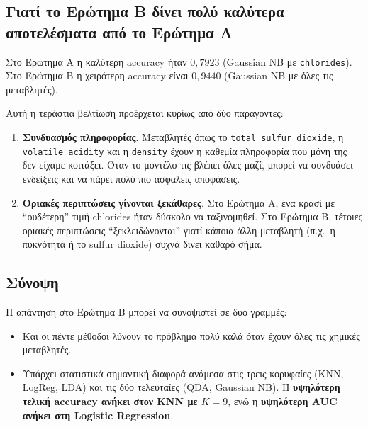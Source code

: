 \documentclass[11pt,a4paper]{article}
\newcommand{\code}[1]{\texttt{#1}}
\begin{document}
\subsection{Γιατί το Ερώτημα Β δίνει πολύ καλύτερα αποτελέσματα από το
Ερώτημα Α}

Στο Ερώτημα Α η καλύτερη accuracy ήταν \(0{,}7923\) (Gaussian NB με
\code{chlorides}). Στο Ερώτημα Β η χειρότερη accuracy είναι \(0{,}9440\)
(Gaussian NB με όλες τις μεταβλητές).

Αυτή η τεράστια βελτίωση προέρχεται κυρίως από δύο παράγοντες:
\begin{enumerate}
    \item \textbf{Συνδυασμός πληροφορίας}. Μεταβλητές όπως το
    \code{total sulfur dioxide}, η \code{volatile acidity} και η
    \code{density} έχουν η καθεμία πληροφορία που μόνη της δεν είχαμε
    κοιτάξει. Όταν το μοντέλο τις βλέπει όλες μαζί, μπορεί να συνδυάσει
    ενδείξεις και να πάρει πολύ πιο ασφαλείς αποφάσεις.

    \item \textbf{Οριακές περιπτώσεις γίνονται ξεκάθαρες}. Στο Ερώτημα
    Α, ένα κρασί με ``ουδέτερη'' τιμή chlorides ήταν δύσκολο να
    ταξινομηθεί. Στο Ερώτημα Β, τέτοιες οριακές περιπτώσεις
    ``ξεκλειδώνονται'' γιατί κάποια άλλη μεταβλητή (π.χ.\ η πυκνότητα ή
    το sulfur dioxide) συχνά δίνει καθαρό σήμα.
\end{enumerate}

\subsection{Σύνοψη}

Η απάντηση στο Ερώτημα Β μπορεί να συνοψιστεί σε δύο γραμμές:
\begin{itemize}
    \item Και οι πέντε μέθοδοι λύνουν το πρόβλημα πολύ καλά όταν έχουν
    όλες τις χημικές μεταβλητές.
    \item Υπάρχει στατιστικά σημαντική διαφορά ανάμεσα στις τρεις
    κορυφαίες (KNN, LogReg, LDA) και τις δύο τελευταίες (QDA, Gaussian
    NB). Η \textbf{υψηλότερη τελική accuracy ανήκει στον KNN με
    \(K=9\)}, ενώ η \textbf{υψηλότερη AUC ανήκει στη Logistic
    Regression}.
\end{itemize}
\end{document}

